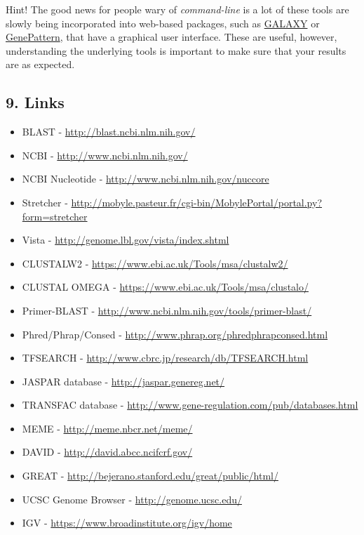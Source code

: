 \documentclass[]{article}
\begin{document}
Hint! The good news for people wary of \emph{command-line} is a lot of
these tools are slowly being incorporated into web-based packages, such
as \href{http://usegalaxy.org}{GALAXY} or
\href{https://www.broadinstitute.org/cancer/software/genepattern/}{GenePattern},
that have a graphical user interface. These are useful, however,
understanding the underlying tools is important to make sure that your
results are as expected.

\subsection{9. Links}\label{links}

\begin{itemize}
\itemsep1pt\parskip0pt
\item
  BLAST - \url{http://blast.ncbi.nlm.nih.gov/}
\item
  NCBI - \url{http://www.ncbi.nlm.nih.gov/}
\item
  NCBI Nucleotide - \url{http://www.ncbi.nlm.nih.gov/nuccore}
\item
  Stretcher -
  \url{http://mobyle.pasteur.fr/cgi-bin/MobylePortal/portal.py?form=stretcher}
\item
  Vista - \url{http://genome.lbl.gov/vista/index.shtml}
\item
  CLUSTALW2 - \url{https://www.ebi.ac.uk/Tools/msa/clustalw2/}
\item
  CLUSTAL OMEGA - \url{https://www.ebi.ac.uk/Tools/msa/clustalo/}
\item
  Primer-BLAST - \url{http://www.ncbi.nlm.nih.gov/tools/primer-blast/}
\item
  Phred/Phrap/Consed - \url{http://www.phrap.org/phredphrapconsed.html}
\item
  TFSEARCH - \url{http://www.cbrc.jp/research/db/TFSEARCH.html}
\item
  JASPAR database - \url{http://jaspar.genereg.net/}
\item
  TRANSFAC database -
  \url{http://www.gene-regulation.com/pub/databases.html}
\item
  MEME - \url{http://meme.nbcr.net/meme/}
\item
  DAVID - \url{http://david.abcc.ncifcrf.gov/}
\item
  GREAT - \url{http://bejerano.stanford.edu/great/public/html/}
\item
  UCSC Genome Browser - \url{http://genome.ucsc.edu/}
\item
  IGV - \url{https://www.broadinstitute.org/igv/home}

\end{itemize}
\end{document}
